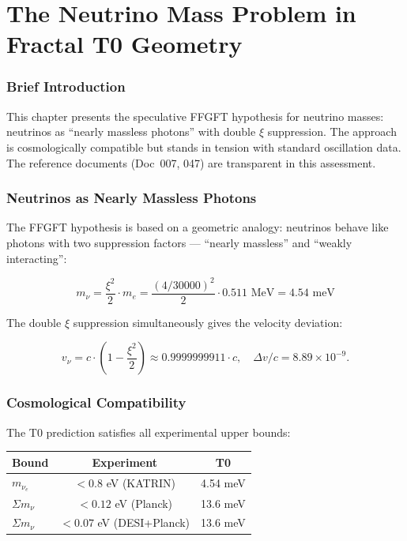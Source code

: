 \chapter{The Neutrino Mass Problem in Fractal T0 Geometry}


	
	\subsection*{Brief Introduction}
	
	This chapter presents the speculative FFGFT hypothesis for neutrino masses: neutrinos as ``nearly massless photons'' with double \(\xi\) suppression. The approach is cosmologically compatible but stands in tension with standard oscillation data. The reference documents (Doc~007, 047) are transparent in this assessment.
	
	\subsection*{Neutrinos as Nearly Massless Photons}
	
	The FFGFT hypothesis is based on a geometric analogy: neutrinos behave like photons with two suppression factors --- ``nearly massless'' and ``weakly interacting'':
	
	\begin{equation}
		\boxed{m_\nu = \frac{\xi^2}{2} \cdot m_e = \frac{(4/30000)^2}{2} \cdot 0.511\text{ MeV} = 4.54\text{ meV}}
	\end{equation}
	
	The double \(\xi\) suppression simultaneously gives the velocity deviation:
	
	\begin{equation}
		v_\nu = c \cdot \left(1 - \frac{\xi^2}{2}\right) \approx 0.9999999911 \cdot c, \quad \Delta v/c = 8.89 \times 10^{-9}.
	\end{equation}
	
	
	\subsection*{Cosmological Compatibility}
	
	The T0 prediction satisfies all experimental upper bounds:
	
	\begin{center}
		\small
		\begin{tabular}{lcc}
			\textbf{Bound} & \textbf{Experiment} & \textbf{T0} \\
			\hline
			\(m_{\nu_e}\) & \(< 0.8\) eV (KATRIN) & 4.54 meV \\
			\(\Sigma m_\nu\) & \(< 0.12\) eV (Planck) & 13.6 meV \\
			\(\Sigma m_\nu\) & \(< 0.07\) eV (DESI+Planck) & 13.6 meV \\
		\end{tabular}
	\end{center}
	
